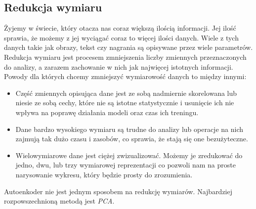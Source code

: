 \documentclass[a4paper,12pt]{book} %
\begin{document}
\subsection{Redukcja wymiaru}
Żyjemy w świecie, który otacza nas coraz większą ilością informacji. Jej ilość sprawia, że możemy z jej wyciągać coraz to więcej ilości danych. Wiele z tych danych takie jak obrazy, tekst czy nagrania są opisywane przez wiele parametrów. Redukcja wymiaru jest procesem zmniejszenia liczby zmiennych przeznaczonych do analizy, a zarazem zachowanie w nich jak najwięcej istotnych informacji. Powody dla których chcemy zmniejszyć wymiarowość danych to między innymi:
\begin{itemize}
	\item Część zmiennych opisująca dane jest ze sobą nadmiernie skorelowana lub niesie ze sobą cechy, które nie są istotne statystycznie i usunięcie ich nie wpływa na poprawę działania modeli oraz czas ich treningu.
	\item Dane bardzo wysokiego wymiaru są trudne do analizy lub operacje na nich zajmują tak dużo czasu i zasobów, co sprawia, że stają się one bezużyteczne. 
	\item Wielowymiarowe dane jest ciężej zwizualizować. Możemy je zredukować do jedno, dwu, lub trzy wymiarowej reprezentacji co pozwoli nam na proste narysowanie wykresu, który będzie prosty do zrozumienia.
\end{itemize}
Autoenkoder nie jest jednym sposobem na redukcję wymiarów. Najbardziej rozpowszechnioną metodą jest \textit{PCA}. 
\end{document}
